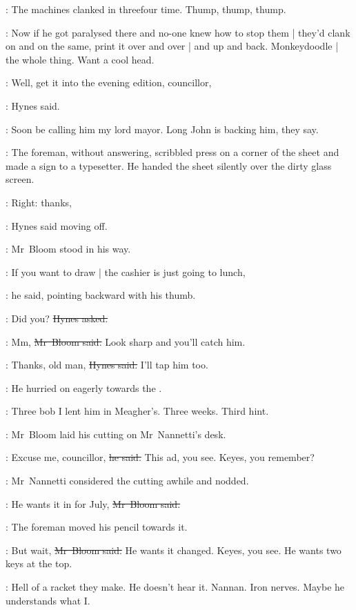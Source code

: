 :
The machines clanked in threefour time.
Thump, thump, thump.

\BloomInt:
Now if he got paralysed there
and no-one knew how to stop them |
they'd clank on and on the same,
print it over and over |
and up and back.
Monkeydoodle |
the whole thing.
Want a cool head.

\hynes:
Well, get it into the evening edition, councillor,

:
Hynes said.

\BloomInt:
Soon be calling him my lord mayor.
Long John is backing him, they say.

:
The foreman, without answering,
scribbled press on a corner of the sheet
and made a sign to a typesetter.
He handed the sheet silently over the dirty glass screen.%

\hynes:
Right: thanks,

:
Hynes said moving off.

:
Mr~Bloom stood in his way.

\Bloom:
If you want to draw |
the cashier is just going to lunch,

:
he said, pointing backward with his thumb.

\hynes:
Did you?
\sout{Hynes asked.}

\Bloom:
Mm,
\sout{Mr~Bloom said.}
Look sharp and you'll catch him.

\hynes:
Thanks, old man,
\sout{Hynes said.}
I'll tap him too.

:
He hurried on eagerly towards the .

\BloomInt:
Three bob I lent him in Meagher's.
Three weeks.
Third hint.


%

:
Mr~Bloom laid his cutting on Mr~Nannetti's desk.

\Bloom:
Excuse me, councillor,
\sout{he said.}
This ad, you see.
Keyes, you remember?

:
Mr~Nannetti considered the cutting awhile and nodded.

\Bloom:
He wants it in for July,
\sout{Mr~Bloom said.}

:
The foreman moved his pencil towards it.

\Bloom:
But wait,
\sout{Mr~Bloom said.}
He wants it changed.
Keyes, you see.
He wants two keys at the top.

\BloomInt:
Hell of a racket they make.
He doesn't hear it.
Nannan.
Iron nerves.
Maybe he understands what I.

